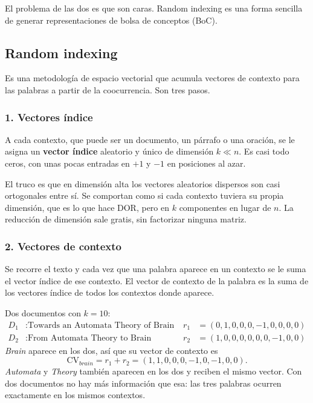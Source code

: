 \documentclass[11pt,letterpaper]{article}
\begin{document}
El problema de las dos es que son caras. Random indexing es una forma
sencilla de generar representaciones de bolsa de conceptos (BoC).

\subsection*{Random indexing}

Es una metodología de espacio vectorial que acumula vectores de
contexto para las palabras a partir de la coocurrencia. Son tres
pasos.

\subsubsection*{1. Vectores índice}

A cada contexto, que puede ser un documento, un párrafo o una
oración, se le asigna un \textbf{vector índice} aleatorio y único de
dimensión $k \ll n$. Es casi todo ceros, con unas pocas entradas en
$+1$ y $-1$ en posiciones al azar.

\begin{idea}
    El truco es que en dimensión alta los vectores aleatorios dispersos
    son casi ortogonales entre sí. Se comportan como si cada contexto
    tuviera su propia dimensión, que es lo que hace DOR, pero en $k$
    componentes en lugar de $n$. La reducción de dimensión sale gratis,
    sin factorizar ninguna matriz.
\end{idea}

\subsubsection*{2. Vectores de contexto}

Se recorre el texto y cada vez que una palabra aparece en un contexto
se le suma el vector índice de ese contexto. El vector de contexto de
la palabra es la suma de los vectores índice de todos los contextos
donde aparece.

\begin{ejemplo}
    Dos documentos con $k = 10$:
    \begin{align*}
        D_1 &: \text{Towards an Automata Theory of Brain}
            & r_1 &= (0,1,0,0,0,-1,0,0,0,0) \\
        D_2 &: \text{From Automata Theory to Brain Theory}
            & r_2 &= (1,0,0,0,0,0,0,-1,0,0)
    \end{align*}
    \textit{Brain} aparece en los dos, así que su vector de contexto es
    \[
        \mathrm{CV}_{\textit{brain}} = r_1 + r_2
        = (1,1,0,0,0,-1,0,-1,0,0) .
    \]
    \textit{Automata} y \textit{Theory} también aparecen en los dos y
    reciben el mismo vector. Con dos documentos no hay más información
    que esa: las tres palabras ocurren exactamente en los mismos
    contextos.
\end{ejemplo}
\end{document}
